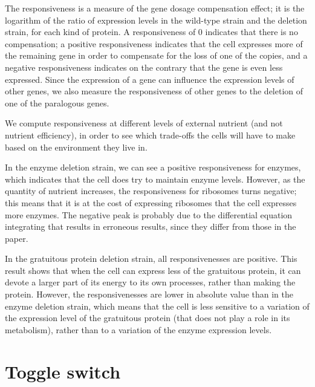 \documentclass[a4paper]{article}
\begin{document}
The responsiveness is a measure of the gene dosage compensation effect; it is the logarithm of the ratio of expression levels in the wild-type strain and the deletion strain, for each kind of protein.
A responsiveness of 0 indicates that there is no compensation; a positive responsiveness indicates that the cell expresses more of the remaining gene in order to compensate for the loss of one of the copies, and a negative responsiveness indicates on the contrary that the gene is even less expressed.
Since the expression of a gene can influence the expression levels of other genes, we also measure the responsiveness of other genes to the deletion of one of the paralogous genes.

We compute responsiveness at different levels of external nutrient (and not nutrient efficiency), in order to see which trade-offs the cells will have to make based on the environment they live in.

In the enzyme deletion strain, we can see a positive responsiveness for enzymes, which indicates that the cell does try to maintain enzyme levels.
However, as the quantity of nutrient increases, the responsiveness for ribosomes turns negative; this means that it is at the cost of expressing ribosomes that the cell expresses more enzymes.
The negative peak is probably due to the differential equation integrating that results in erroneous results, since they differ from those in the paper.

In the gratuitous protein deletion strain, all responsivenesses are positive.
This result shows that when the cell can express less of the gratuitous protein, it can devote a larger part of its energy to its own processes, rather than making the protein.
However, the responsivenesses are lower in absolute value than in the enzyme deletion strain, which means that the cell is less sensitive to a variation of the expression level of the gratuitous protein (that does not play a role in its metabolism), rather than to a variation of the enzyme expression levels.


\FloatBarrier

\section{Toggle switch}
\end{document}
